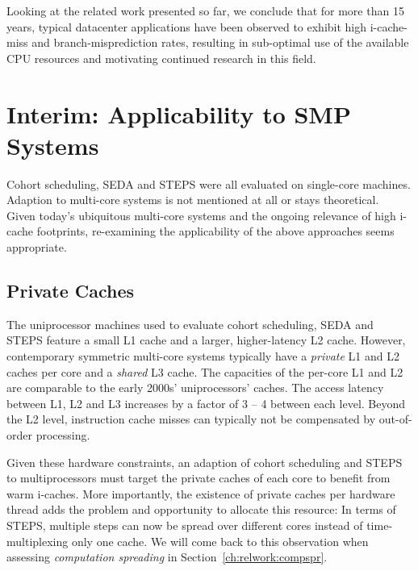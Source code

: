 \documentclass[12pt,a4paper]{book}
\begin{document}
Looking at the related work presented so far, we conclude that for more than 15 years, typical datacenter applications have been observed to exhibit high i-cache-miss and branch-misprediction rates, resulting in sub-optimal use of the available CPU resources and motivating continued research in this field.

\section{Interim: Applicability to SMP Systems}\label{ch:relwork:anasmp}
Cohort scheduling, SEDA and STEPS were all evaluated on single-core machines.
Adaption to multi-core systems is not mentioned at all or stays theoretical.~\cite{steps,harizopoulos2003case}
Given today's ubiquitous multi-core systems and the ongoing relevance of high i-cache footprints, re-examining the applicability of the above approaches seems appropriate.

\subsection{Private Caches}
The uniprocessor machines used to evaluate cohort scheduling, SEDA and STEPS feature a small L1 cache and a larger, higher-latency L2 cache.
However, contemporary symmetric multi-core systems typically have a \emph{private} L1 and L2 caches per core and a \emph{shared} L3 cache.
The capacities of the per-core L1 and L2 are comparable to the early 2000s' uniprocessors' caches.
The access latency between L1, L2 and L3 increases by a factor of 3 -- 4 between each level.
Beyond the L2 level, instruction cache misses can typically not be compensated by out-of-order processing.~\cite{hennessy2002,haswellCacheLatency} %

Given these hardware constraints, an adaption of cohort scheduling and STEPS to multiprocessors must target the private caches of each core to benefit from warm i-caches.
More importantly, the existence of private caches per hardware thread adds the problem and opportunity to allocate this resource:
In terms of STEPS, multiple steps can now be spread over different cores instead of time-multiplexing only one cache.
We will come back to this observation when assessing \emph{computation spreading} in Section~\ref{ch:relwork:compspr}.
\end{document}
